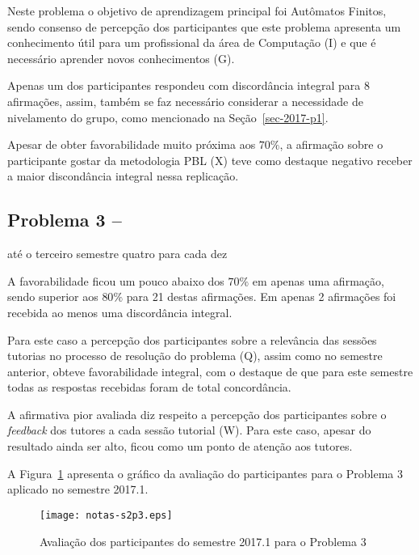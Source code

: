 Neste problema o objetivo de aprendizagem principal foi
Autômatos Finitos, sendo consenso de percepção dos participantes que
este problema apresenta um conhecimento útil para um profissional
da área de Computação (I) e que é necessário aprender novos
conhecimentos (G).

Apenas um dos participantes respondeu com discordância integral para
8 afirmações, assim, também se faz necessário considerar a
necessidade de nivelamento do grupo, como mencionado
na Seção~\ref{sec-2017-p1}.

Apesar de obter favorabilidade muito próxima aos $70\%$, a afirmação
sobre o participante gostar da metodologia PBL (X) teve como
destaque negativo receber a maior discondância integral nessa
replicação.


\subsection{Problema 3 -- \ProblemaC}
{até o terceiro semestre}{ quatro para cada dez}

A favorabilidade ficou um pouco abaixo dos $70\%$ em apenas uma afirmação,
sendo superior aos $80\%$ para 21 destas afirmações.
Em apenas 2 afirmações foi recebida ao menos uma discordância integral.

Para este caso a percepção dos participantes
sobre a relevância das sessões tutorias no processo
de resolução do problema (Q), assim como no semestre
anterior, obteve favorabilidade integral, com o destaque de
que para este semestre todas as respostas recebidas foram de
total concordância.

A afirmativa pior avaliada diz respeito a percepção dos participantes
sobre o \textit{feedback} dos tutores a cada sessão tutorial (W).
Para este caso, apesar do resultado ainda ser alto, ficou como
um ponto de atenção aos tutores.

A Figura~\ref{aval-s2p3} apresenta o gráfico da
avaliação do participantes para o Problema 3 aplicado no semestre 2017.1.

\begin{figure}[!htb]
\centering
\texttt{[image: notas-s2p3.eps]}
\caption{Avaliação dos participantes do semestre 2017.1 para o Problema 3}
\label{aval-s2p3}
\end{figure}

